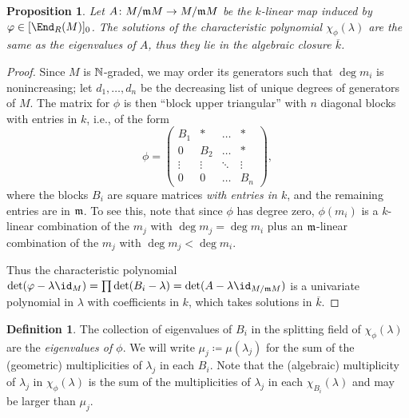 \documentclass[12pt]{article}
\let\bar\overline
\theoremstyle{theorem}
\numberwithin{thm}{section}
\newtheorem{prop}[thm]{Proposition}
\theoremstyle{definition}
\newtheorem{dfn}[thm]{Definition}
\begin{document}
\begin{prop}\label{prop:eigenvalues}
  Let $A\colon M/\mathfrak m M\to M/\mathfrak m M$ be the $k$-linear map induced by $\phi\in[\End_R(M)]_0$. The solutions of the characteristic polynomial $\chi_\phi(\lambda)$ are the same as the eigenvalues of $A$, thus they lie in the algebraic closure $\bar k$.
\end{prop}
\begin{proof}
  Since $M$ is $\mathbb N$-graded, we may order its generators such that $\deg m_i$ is nonincreasing; let $d_1,\dots,d_n$ be the decreasing list of unique degrees of generators of $M$. The matrix for $\phi$ is then ``block upper triangular'' with $n$ diagonal blocks with entries in $k$, i.e., of the form
  \begin{equation}\label{eq:blocks}
    \phi = \begin{pmatrix}
    B_1    & *      & \dots  & *      \\
    0      & B_2    & \dots  & *      \\
    \vdots & \vdots & \ddots & \vdots \\
    0      & 0      & \dots  & B_n
    \end{pmatrix},
  \end{equation}
  where the blocks $B_i$ are square matrices \emph{with entries in $k$}, and the remaining entries are in $\mathfrak m$. To see this, note that since $\phi$ has degree zero, $\phi(m_i)$ is a $k$-linear combination of the $m_j$ with $\deg m_j = \deg m_i$ plus an $\mathfrak m$-linear combination of the $m_j$ with $\deg m_j < \deg m_i$. %

  Thus the characteristic polynomial $\det(\phi - \lambda \id_M) = \prod \det(B_i - \lambda) = \det(A - \lambda \id_{M/\m M})$ is a univariate polynomial in $\lambda$ with coefficients in $k$, which takes solutions in $\bar k$.
\end{proof}

\begin{dfn}\label{def:eigenvalues}
  The collection of eigenvalues of $B_i$ in the splitting field of $\chi_\phi(\lambda)$ are the \emph{eigenvalues of $\phi$}. We will write $\mu_j \coloneqq \mu(\lambda_j)$ for the sum of the (geometric) multiplicities of $\lambda_j$ in each $B_i$. Note that the (algebraic) multiplicity of $\lambda_j$ in $\chi_\phi(\lambda)$ is the sum of the multiplicities of $\lambda_j$ in each $\chi_{B_i}(\lambda)$ and may be larger than $\mu_j$.
\end{dfn}
\end{document}
